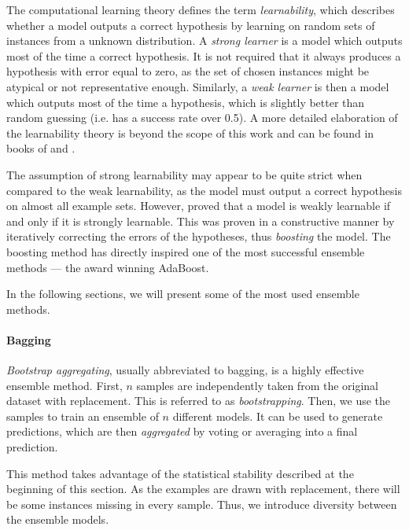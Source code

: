 The computational learning theory defines the term \emph{learnability},
which describes whether a model outputs a correct hypothesis by learning on
random sets of instances from a unknown distribution. A \emph{strong learner}
is a model which outputs most of the time a correct hypothesis. It is not
required that it always produces a hypothesis with error equal to zero, as 
the set of chosen instances might be atypical or not representative enough.
Similarly, a \emph{weak learner} is then a model which outputs most of the time
a hypothesis, which is slightly better than random guessing (i.e. has a
success rate over 0.5). A more detailed elaboration of the learnability
theory is beyond the scope of this work and can be found in books 
of \citep{Flach:2012:MLA:2490546} and \citep{Mitchell:1997:ML:541177}.

The assumption of strong learnability may appear to be quite strict when 
compared to the weak learnability, as the model must output a correct 
hypothesis on almost all example sets. However,
\cite{Schapire:1990:SWL:83637.83645} proved that a model 
is weakly learnable if and only if it is strongly learnable. 
 This was proven in a constructive manner
by iteratively correcting the errors of the hypotheses, thus \emph{boosting} 
the model. The boosting method has directly inspired one of the most successful
ensemble methods --- the award winning AdaBoost.
\citep{Freund:1996:ENB:3091696.3091715, Freund:1997:DGO:261540.261549}

In the following sections, we will present some of the most used ensemble 
methods.
\paragraph{Bagging} \label{bagging}
\emph{Bootstrap aggregating}, usually abbreviated to bagging, is a highly
effective ensemble method. First, $n$ samples are independently taken from 
the original dataset with replacement. This is referred to as 
\emph{bootstrapping}. Then, we use the samples to train an ensemble of $n$
different models. It can be used to generate predictions, which are
then \emph{aggregated} by voting or averaging into a final prediction.

This method takes advantage of the statistical stability described at the
beginning of this section. As the examples are drawn with replacement, there
will be some instances missing in every sample. Thus, we introduce diversity
between the ensemble models. \citep[331]{Flach:2012:MLA:2490546}

